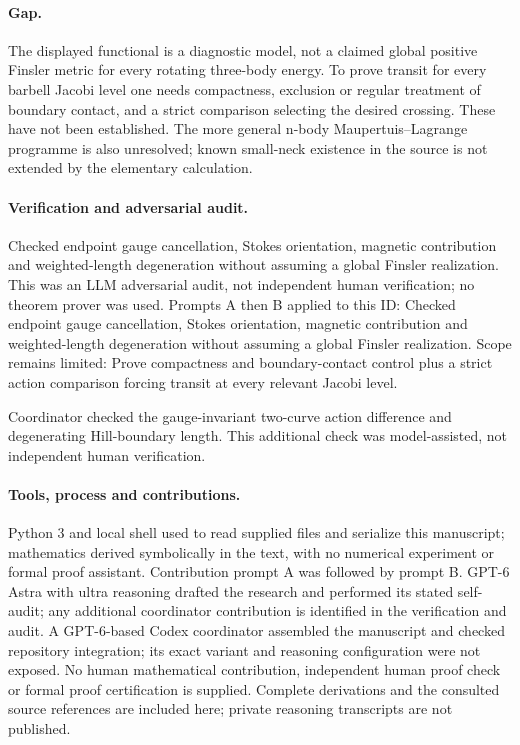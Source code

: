 \documentclass[11pt]{article}
\begin{document}
\paragraph{Gap.}The displayed functional is a diagnostic model, not a claimed global positive Finsler metric for every rotating three-body energy. To prove transit for every barbell Jacobi level one needs compactness, exclusion or regular treatment of boundary contact, and a strict comparison selecting the desired crossing. These have not been established. The more general n-body Maupertuis--Lagrange programme is also unresolved; known small-neck existence in the source is not extended by the elementary calculation.

\paragraph{Verification and adversarial audit.}
Checked endpoint gauge cancellation, Stokes orientation, magnetic contribution and weighted-length degeneration without assuming a global Finsler realization. This was an LLM adversarial audit, not independent human verification; no theorem prover was used. Prompts A then B applied to this ID: Checked endpoint gauge cancellation, Stokes orientation, magnetic contribution and weighted-length degeneration without assuming a global Finsler realization. Scope remains limited: Prove compactness and boundary-contact control plus a strict action comparison forcing transit at every relevant Jacobi level.

Coordinator checked the gauge-invariant two-curve action difference and degenerating Hill-boundary length. This additional check was model-assisted, not independent human verification.

\paragraph{Tools, process and contributions.}
Python 3 and local shell used to read supplied files and serialize this manuscript; mathematics derived symbolically in the text, with no numerical experiment or formal proof assistant. Contribution prompt A was followed by prompt B. GPT-6 Astra with ultra reasoning drafted the research and performed its stated self-audit; any additional coordinator contribution is identified in the verification and audit. A GPT-6-based Codex coordinator assembled the manuscript and checked repository integration; its exact variant and reasoning configuration were not exposed. No human mathematical contribution, independent human proof check or formal proof certification is supplied. Complete derivations and the consulted source references are included here; private reasoning transcripts are not published.
\end{document}
